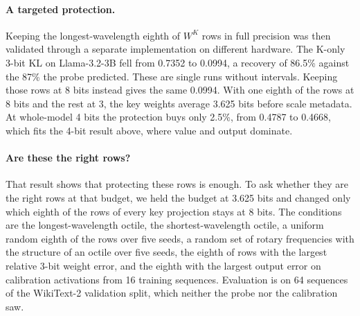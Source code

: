 \documentclass[journal]{IEEEtran}
\begin{document}
\paragraph{A targeted protection.} Keeping the longest-wavelength eighth of $W^K$ rows in full
precision was then validated through a separate implementation on different hardware. The K-only
3-bit KL on Llama-3.2-3B fell from 0.7352 to 0.0994, a recovery of 86.5\% against the 87\% the
probe predicted. These are single runs without intervals. Keeping those rows at 8 bits instead gives the same 0.0994. With one eighth of
the rows at 8 bits and the rest at 3, the key weights average 3.625 bits before scale metadata.
At whole-model 4 bits the protection buys only 2.5\%, from 0.4787 to 0.4668, which fits the
4-bit result above, where value and output dominate.

\paragraph{Are these the right rows?} That result shows that protecting these rows is enough. To
ask whether they are the right rows at that budget, we held the budget at 3.625 bits and changed
only which eighth of the rows of every key projection stays at 8 bits. The conditions are the
longest-wavelength octile, the shortest-wavelength octile, a uniform random eighth of the rows
over five seeds, a random set of rotary frequencies with the structure of an octile over five
seeds, the eighth of rows with the largest relative 3-bit weight error, and the eighth with the
largest output error on calibration activations from 16 training sequences. Evaluation is on 64
sequences of the WikiText-2 validation split, which neither the probe nor the calibration saw.
\end{document}
